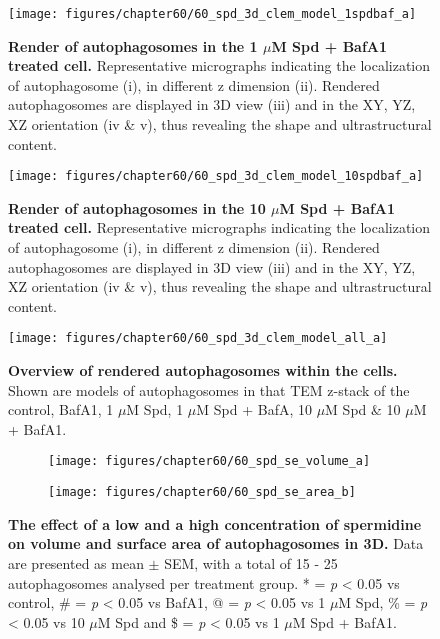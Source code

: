\begin{figure}[!htbp]
\center
  \texttt{[image: figures/chapter60/60\_spd\_3d\_clem\_model\_1spdbaf\_a]}
  \caption[Render of autophagosomes in the 1 $\mu$M Spd  + BafA1 treated cell]{\textbf{Render of autophagosomes in the 1 $\mu$M Spd  + BafA1 treated cell.} Representative micrographs indicating the localization of autophagosome (i), in different z dimension (ii). Rendered autophagosomes are displayed in 3D view (iii) and in the XY, YZ, XZ orientation  (iv \& v), thus revealing the shape and ultrastructural content.}
  \label{fig:60_spd_3d_clem_model_1spdbaf_a}
\end{figure} 

\begin{figure}[!htbp]
\center
  \texttt{[image: figures/chapter60/60\_spd\_3d\_clem\_model\_10spdbaf\_a]}
  \caption[Render of autophagosomes in the 10 $\mu$M Spd  + BafA1 treated cell]{\textbf{Render of autophagosomes in the 10 $\mu$M Spd  + BafA1 treated cell.} Representative micrographs indicating the localization of autophagosome (i), in different z dimension (ii). Rendered autophagosomes are displayed in 3D view (iii) and in the XY, YZ, XZ orientation  (iv \& v), thus revealing the shape and ultrastructural content.}
  \label{fig:60_spd_3d_clem_model_10spdbaf_a}
\end{figure} 

\begin{landscape}
\begin{figure}[!htbp]
\center
  \texttt{[image: figures/chapter60/60\_spd\_3d\_clem\_model\_all\_a]}
  \caption[Overview of rendered autophagosomes within the cells]{\textbf{Overview of rendered autophagosomes within the cells.} Shown are models of autophagosomes in that TEM z-stack of the control, BafA1, 1 $\mu$M Spd, 1 $\mu$M Spd + BafA, 10 $\mu$M Spd \& 10 $\mu$M + BafA1.}
  \label{fig:60_spd_3d_clem_model_all_a}
\end{figure} 
\end{landscape}

\begin{figure}[!htbp]
  \begin{subfigure}[b]{0.495\linewidth}
    \texttt{[image: figures/chapter60/60\_spd\_se\_volume\_a]}
  \end{subfigure}
  \begin{subfigure}[b]{0.495\linewidth}
    \texttt{[image: figures/chapter60/60\_spd\_se\_area\_b]}
  \end{subfigure}
    \caption[The effect of a low and a high concentration of spermidine on volume and surface area of autophagosomes in 3D]{\textbf{The effect of a low and a high concentration of spermidine on volume and surface area of autophagosomes in 3D.} Data are presented as mean $\pm$ SEM, with a total of 15 - 25 autophagosomes analysed per treatment group. * = \textit{p} < 0.05 vs control, \# = \textit{p} < 0.05 vs BafA1, @ = \textit{p} < 0.05 vs 1 $\mu$M Spd, \% = \textit{p} < 0.05 vs 10 $\mu$M Spd and \$ = \textit{p} < 0.05 vs 1 $\mu$M Spd + BafA1.}
  \label{fig:60_spd_se_volume_a}
\end{figure}

